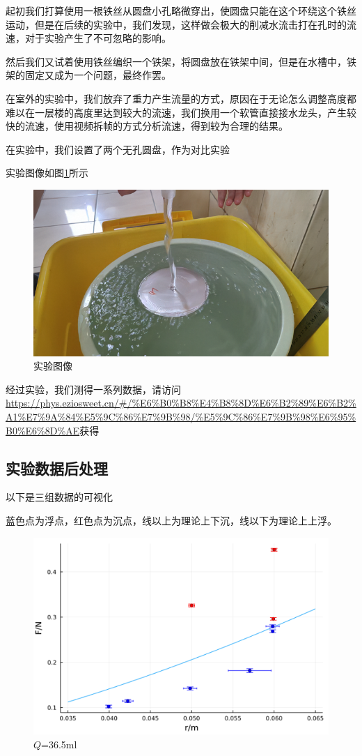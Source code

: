 \documentclass[UTF8]{gapd}
\begin{document}
起初我们打算使用一根铁丝从圆盘小孔略微穿出，使圆盘只能在这个环绕这个铁丝运动，但是在后续的实验中，我们发现，这样做会极大的削减水流击打在孔时的流速，对于实验产生了不可忽略的影响。

然后我们又试着使用铁丝编织一个铁架，将圆盘放在铁架中间，但是在水槽中，铁架的固定又成为一个问题，最终作罢。

在室外的实验中，我们放弃了重力产生流量的方式，原因在于无论怎么调整高度都难以在一层楼的高度里达到较大的流速，我们换用一个软管直接接水龙头，产生较快的流速，使用视频拆帧\cite{gh:SAE}的方式分析流速，得到较为合理的结果。

在实验中，我们设置了两个无孔圆盘，作为对比实验

实验图像如图\ref{fig:unsinkable_disc_experiment}所示
\begin{figure}[!htbp]%
  \centering
  \includegraphics[width=0.8\columnwidth]{images/experiment.png}
  \caption{实验图像}
  \label{fig:unsinkable_disc_experiment}%
\end{figure}

经过实验，我们测得一系列数据，请访问\url{https://phys.eziosweet.cn/#/%E6%B0%B8%E4%B8%8D%E6%B2%89%E6%B2%A1%E7%9A%84%E5%9C%86%E7%9B%98/%E5%9C%86%E7%9B%98%E6%95%B0%E6%8D%AE}获得

\subsection{实验数据后处理}

以下是三组数据的可视化

蓝色点为浮点，红色点为沉点，线以上为理论上下沉，线以下为理论上上浮。
\begin{figure}[!htbp]%
  \centering
  \includegraphics[width=0.8\columnwidth]{images/36.5.png}
  \caption{$Q$=36.5ml}
  \label{fig:unsinkable_disc_36.5}%
\end{figure}
\end{document}
